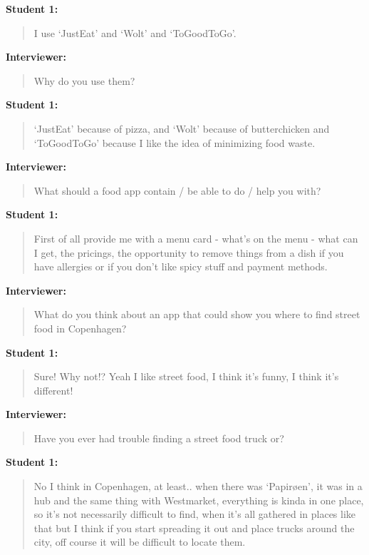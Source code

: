 \textbf{Student 1:}
\begin{quotation}
    I use ‘JustEat’ and ‘Wolt’ and ‘ToGoodToGo’.
\end{quotation}

\textbf{Interviewer:}
\begin{quotation}
    Why do you use them?
\end{quotation}

\textbf{Student 1:}
\begin{quotation}
    ‘JustEat’ because of pizza, and ‘Wolt’ because of butterchicken and ‘ToGoodToGo’ because I like the idea of minimizing food waste.
\end{quotation}

\textbf{Interviewer:}
\begin{quotation}
    What should a food app contain / be able to do / help you with?
\end{quotation}

\textbf{Student 1:}
\begin{quotation}
    First of all provide me with a menu card - what’s on the menu - what can I get, the pricings, the opportunity to remove things from a dish if you have allergies or if you don’t like spicy stuff and payment methods.
\end{quotation}

\textbf{Interviewer:}
\begin{quotation}
    What do you think about an app that could show you where to find street food in Copenhagen?
\end{quotation}

\textbf{Student 1:}
\begin{quotation}
    Sure! Why not!? Yeah I like street food, I think it’s funny, I think it’s different!
\end{quotation}

\textbf{Interviewer:}
\begin{quotation}
    Have you ever had trouble finding a street food truck or?
\end{quotation}

\textbf{Student 1:}
\begin{quotation}
    No I think in Copenhagen, at least.. when there was ‘Papirøen’, it was in a hub and the same thing with Westmarket, everything is kinda in one place, so it’s not necessarily difficult to find, when it’s all gathered in places like that but I think if you start spreading it out and place trucks around the city, off course it will be difficult to locate them.
\end{quotation}

